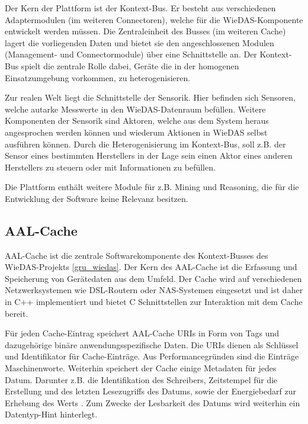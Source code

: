 Der Kern der Plattform ist der Kontext-Bus.
Er besteht aus verschiedenen Adaptermodulen (im weiteren Connectoren), welche für die WieDAS-Komponente
entwickelt werden müssen.
Die Zentraleinheit des Busses (im weiteren Cache) lagert die vorliegenden Daten und bietet sie
den angeschlossenen Modulen (Management- und Connectormodule) über eine Schnittstelle an.
Der Kontext-Bus spielt die zentrale Rolle dabei, Geräte die in der homogenen Einsatzumgebung vorkommen, zu
heterogenisieren.

Zur realen Welt liegt die Schnittstelle der Sensorik.
Hier befinden sich Sensoren, welche autarke Messwerte \cite[Plattform]{wiedas} in den WieDAS-Datenraum
befüllen.
Weitere Komponenten der Sensorik sind Aktoren, welche aus dem System heraus angesprochen werden können
und wiederum Aktionen in WieDAS selbst ausführen können.
Durch die Heterogenisierung im Kontext-Bus, soll z.B. der Sensor eines bestimmten Herstellers in der
Lage sein einen Aktor eines anderen Herstellers zu steuern oder mit Informationen zu befüllen.

Die Plattform enthält weitere Module für z.B. Mining und Reasoning, die für die Entwicklung
der Software keine Relevanz besitzen.

\subsection{AAL-Cache}
\label{gru_aalcache}

AAL-Cache ist die zentrale Softwarekomponente des Kontext-Busses des WieDAS-Projekts \ref{gru_wiedas}.
Der Kern des AAL-Cache ist die Erfassung und Speicherung von Gerätedaten aus dem Umfeld.
Der Cache wird auf verschiedenen Netzwerksystemen wie DSL-Routern oder NAS-Systemen eingesetzt \cite{aalcache_online}
und ist daher in C++ implementiert und bietet C Schnittstellen zur Interaktion mit dem Cache bereit.

Für jeden Cache-Eintrag speichert AAL-Cache URIs in Form von Tags und dazugehörige binäre anwendungsspezifische
Daten.
Die URIs dienen als Schlüssel und Identifikator für Cache-Einträge.
Aus Performancegründen sind die Einträge Maschinenworte.
Weiterhin speichert der Cache einige Metadaten für jedes Datum.
Darunter z.B. die Identifikation des Schreibers, Zeitstempel für die Erstellung und des letzten
Lesezugriffs des Datums, sowie der Energiebedarf zur Erhebung des Werts \cite{aalcache_online}.
Zum Zwecke der Lesbarkeit des Datums wird weiterhin ein Datentyp-Hint hinterlegt.

